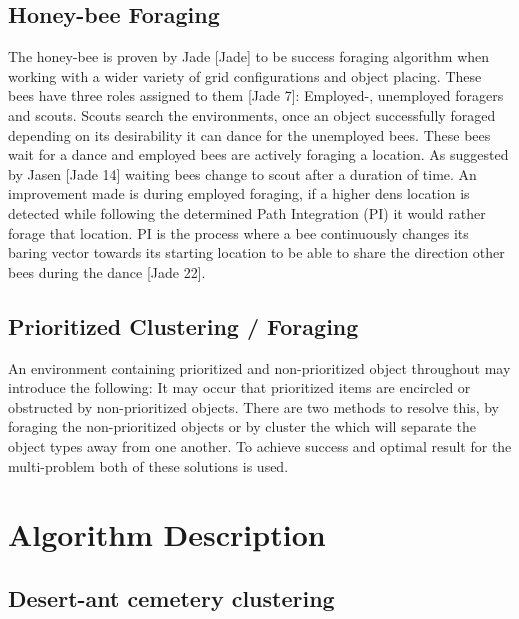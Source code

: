 \documentclass[12pt]{article}
\begin{document}
\subsection{Honey-bee Foraging}

\par{The honey-bee is proven by Jade [Jade] to be success foraging algorithm when working with a wider variety of grid configurations and object placing. These bees have three roles assigned to them [Jade 7]: Employed-, unemployed foragers and scouts. Scouts search the environments, once an object successfully foraged depending on its desirability it can dance for the unemployed bees. These bees wait for a dance and employed bees are actively foraging a location. As suggested by Jasen [Jade 14] waiting bees change to scout after a duration of time. An improvement made is during employed foraging, if a higher dens location is detected while following the determined Path Integration (PI) it would rather forage that  location. PI is the process where a bee continuously changes its baring vector towards its starting location to be able to share the direction other bees during the dance [Jade 22].}

\subsection{Prioritized Clustering / Foraging}

\par{An environment containing prioritized and non-prioritized object throughout may introduce the following: It may occur that prioritized items are encircled or obstructed by non-prioritized objects. There are two methods to resolve this, by foraging the non-prioritized objects or by cluster the which will separate the object types away from one another. To achieve success and optimal result for the multi-problem both of these solutions is used.}

\section{Algorithm Description}

\subsection{Desert-ant cemetery clustering}
\end{document}
